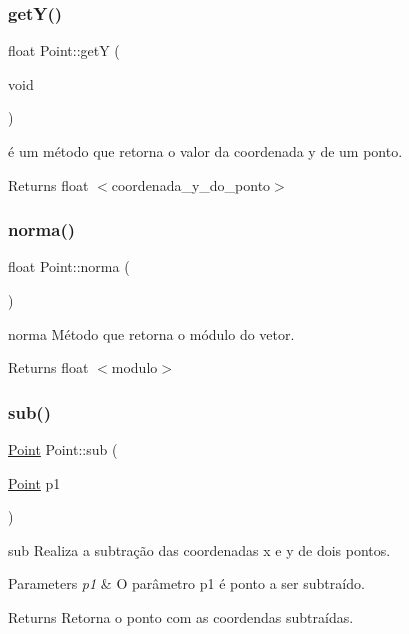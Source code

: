 \subsubsection{\texorpdfstring{get\+Y()}{getY()}}
{\footnotesize\ttfamily float Point\+::getY (\begin{DoxyParamCaption}\item[{void}]{ }\end{DoxyParamCaption})}



é um método que retorna o valor da coordenada y de um ponto. 

\begin{DoxyReturn}{Returns}
float $<$coordenada\+\_\+y\+\_\+do\+\_\+ponto$>$ 
\end{DoxyReturn}
\mbox{\label{classPoint_abd2618d1f505d9392893273a66e7c9b2}} 
\subsubsection{\texorpdfstring{norma()}{norma()}}
{\footnotesize\ttfamily float Point\+::norma (\begin{DoxyParamCaption}{ }\end{DoxyParamCaption})}



norma Método que retorna o módulo do vetor. 

\begin{DoxyReturn}{Returns}
float $<$modulo$>$ 
\end{DoxyReturn}
\mbox{\label{classPoint_a9cf2c53b0a4e6282a6712824bb4e9b00}} 
\subsubsection{\texorpdfstring{sub()}{sub()}}
{\footnotesize\ttfamily \hyperlink{classPoint}{Point} Point\+::sub (\begin{DoxyParamCaption}\item[{\hyperlink{classPoint}{Point}}]{p1 }\end{DoxyParamCaption})}



sub Realiza a subtração das coordenadas x e y de dois pontos. 


\begin{DoxyParams}{Parameters}
{\em p1} & O parâmetro p1 é ponto a ser subtraído. \\
\hline
\end{DoxyParams}
\begin{DoxyReturn}{Returns}
Retorna o ponto com as coordendas subtraídas. 
\end{DoxyReturn}
\mbox{\label{classPoint_ad9676e36f3444534b609e3c68422239a}} 
